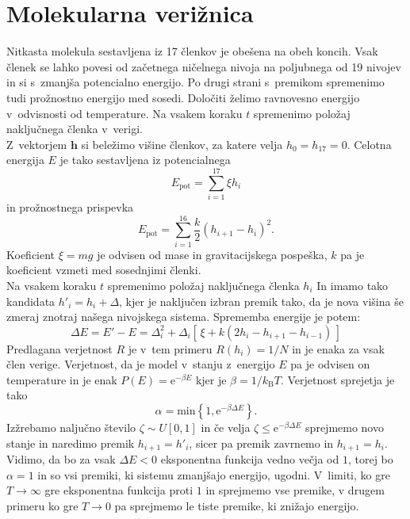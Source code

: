 \documentclass[a4paper,pdftex,10pt]{article}
\renewcommand{\vec}[1]{\boldsymbol{\mathbf{#1}}}
\numberwithin{figure}{section} %
\begin{document}
\pagebreak
\section{Molekularna verižnica}
Nitkasta molekula sestavljena iz 17 členkov je obešena na obeh koncih. Vsak členek se lahko
povesi od začetnega ničelnega nivoja na poljubnega od 19 nivojev in si s~zmanjša potencialno
energijo. Po drugi strani s~premikom spremenimo tudi prožnostno energijo med sosedi. 
Določiti želimo ravnovesno energijo v~odvisnosti od temperature. Na vsakem koraku $t$ 
spremenimo položaj naključnega členka v~verigi. \\
Z~vektorjem $\vec{h}$ si beležimo višine členkov, za katere velja $h_0 = h_{17} = 0$.
Celotna energija $E$ je tako sestavljena iz potencialnega
\begin{equation}
    E_{\text{pot}} = \sum_{i=1}^{17} \xi h_i 
\end{equation}
in prožnostnega prispevka
\begin{equation}
    E_{\text{pot}} = \sum_{i=1}^{16} \frac{k}{2} (h_{i+1} -h_i)^2.
\end{equation}
Koeficient $\xi = mg$ je odvisen od mase in gravitacijskega pospeška, $k$ pa je koeficient
vzmeti med sosednjimi členki.\\
Na vsakem koraku $t$ spremenimo položaj naključnega členka $h_i$ In imamo tako kandidata
$h'_i = h_i + \Delta$, kjer je naključen izbran premik tako, da je nova višina še zmeraj 
znotraj našega nivojskega sistema. Sprememba energije je potem:
\begin{equation}
    \Delta E = E' - E = \Delta_i^2 + \Delta_i \left[ \, \xi + k \left(2 h_i - h_{i+1} -
    h_{i-1} \right) \, \right]
\end{equation}
Predlagana verjetnost $R$ je v~tem primeru $R(h_i) = 1/N$ in je enaka za vsak člen verige.
Verjetnost, da je model v~stanju z~energijo $E$ pa je odvisen on temperature in je enak 
$P(E) = \mathrm{e}^{- \beta E}$ kjer je $\beta = 1/k_{\mathrm{B}} T $. Verjetnost sprejetja
je tako
\begin{equation}
    \alpha = \text{min} \left\{ 1, \mathrm{e}^{- \beta \Delta E}  \right\}.
\end{equation}
Izžrebamo naljučno število $\zeta \sim U[0,1]$ in če velja $\zeta \leq \mathrm{e}^{- \beta 
\Delta E}$ sprejmemo novo stanje in naredimo premik $h_{i+1} = h'_i$, sicer pa premik
zavrnemo in $h_{i+1} = h_i$. Vidimo, da bo za vsak $\Delta E < 0$ eksponentna funkcija
vedno večja od $1$, torej bo $\alpha=1$ in so vsi premiki, ki sistemu zmanjšajo energijo,
ugodni. V~limiti, ko gre $T \rightarrow \infty$ gre eksponentna funkcija proti $1$ in 
sprejmemo vse premike, v drugem primeru ko gre $T \rightarrow 0$ pa sprejmemo le tiste
premike, ki znižajo energijo.
\end{document}
